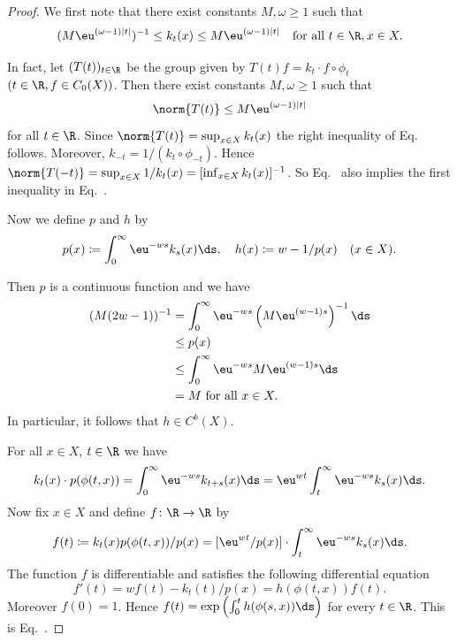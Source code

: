 \begin{proof}
We first note that there exist constants $M, \omega \geq 1$ such that
\begin{equation}\label{eq:b2-3.16}
(M\eu^{(\omega-1)|t|})^{-1} \leq k_{t}(x) \leq M\eu^{(\omega-1)|t|} \quad \text{for all } t \in \R, x \in X.
\end{equation}

In fact, let $(T(t))_{t \in \R}$ be the group given by $T(t)f = k_{t} \cdot f \circ \phi_{t}$ $(t \in \R, f \in C_{0}(X))$.
Then there exist constants $M, \omega \geq 1$ such that
\begin{equation}\label{eq:b2-3.17}
\norm{T(t)} \leq M\eu^{(\omega-1)|t|}
\end{equation}
for all $t \in \R$.
Since $\norm{T(t)} = \sup_{x \in X} k_{t}(x)$ the right inequality of
Eq.~ follows.
Moreover, $k_{-t} = 1/(k_{t} \circ \phi_{-t})$.
Hence $\norm{T(-t)} = \sup_{x \in X} 1/k_{t}(x) = [\inf_{x \in X} k_{t}(x)]^{-1}$.
So Eq.~ also implies the first inequality in Eq.~.

Now we define $p$ and $h$ by
\[
p(x) \coloneqq \int_{0}^{\infty} \eu^{-ws}k_{s}(x) \ds, \quad
h(x) \coloneqq w - 1/p(x) \quad (x \in X).
\]

Then $p$ is a continuous function and we have 
\begin{align*}
(M(2w - 1))^{-1} &= \int_{0}^{\infty} \eu^{-ws}\left(M\eu^{(w-1)s}\right)^{-1} \ds \\ 
&\leq p(x) \\ 
&\leq \int_{0}^{\infty} \eu^{-ws}M\eu^{(w-1)s} \ds \\
&= M \text{ for all } x \in X.
\end{align*}
In particular, it follows that $h \in C^{b}(X)$.

For all $x \in X$, $t \in \R$ we have 
\[
k_{t}(x) \cdot p(\phi(t,x)) = \int_{0}^{\infty} \eu^{-ws}k_{t+s}(x) \ds = \eu^{wt} \int_{t}^{\infty} \eu^{-ws}k_{s}(x) \ds.
\]
Now fix $x \in X$ and define $f \colon \R \to \R$ by 
\[
f(t) \coloneqq k_{t}(x)p(\phi(t,x))/p(x) = [\eu^{wt}/p(x)] \cdot \int_{t}^{\infty} \eu^{-ws}k_{s}(x)  \ds.
\]
The function $f$ is differentiable and satisfies the following differential equation 
\[
f'(t) = wf(t)  - k_{t}(t)/p(x)  = h(\phi(t,x))f(t).
\]
Moreover $f(0) = 1$.
Hence $f(t) = \exp\left(\int_{0}^{t} h(\phi(s,x)) \ds\right)$ for every $t \in \R$.
This is Eq.~.
\end{proof}

